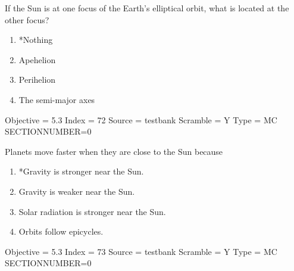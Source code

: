 \documentclass[11pt]{article}
\begin{document}
\begin{enumerate}
\begin{minipage}{\textwidth}
\begin{minipage}{\textwidth}
\item If the Sun is at one focus of the Earth’s elliptical orbit, what is located at the other focus?
\begin{multicols}{3}
\begin{enumerate} 
\setlength{\itemsep}{1pt} 
\setlength{\parskip}{0pt} 
\setlength{\parsep}{0pt}
\setlength{\multicolsep}{1pt} 
\item *Nothing
\item Apehelion
\item Perihelion
\item The semi-major axes
\end{enumerate} 
\vfill 
\end{multicols}

Objective = 5.3
Index = 72
Source = testbank
Scramble = Y
Type = MC
SECTIONNUMBER=0
\end{minipage}
\end{minipage}
\vskip 0.20in

\begin{minipage}{\textwidth}
\begin{minipage}{\textwidth}
\item Planets move faster when they are close to the Sun because
\begin{enumerate} 
\setlength{\itemsep}{1pt} 
\setlength{\parskip}{0pt} 
\setlength{\parsep}{0pt}
\setlength{\multicolsep}{1pt} 
\item *Gravity is stronger near the Sun.
\item Gravity is weaker near the Sun.
\item Solar radiation is stronger near the Sun.
\item Orbits follow epicycles.
\end{enumerate} 
Objective = 5.3
Index = 73
Source = testbank
Scramble = Y
Type = MC
SECTIONNUMBER=0
\end{minipage}
\end{minipage}
\vskip 0.20in


\end{enumerate}
\end{document}
